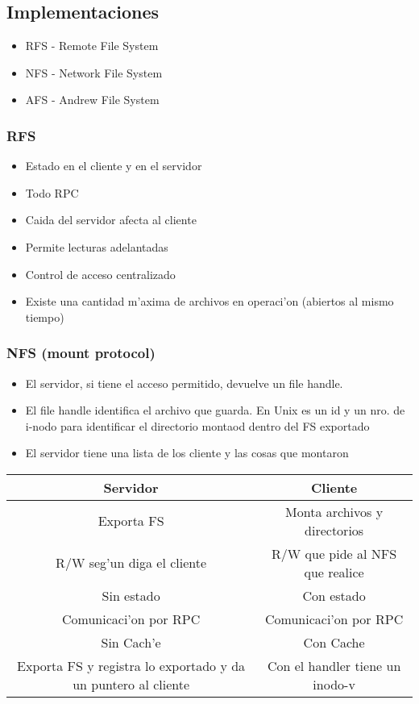 \documentclass[a4paper,spanish]{article}
\begin{document}
\subsection{Implementaciones}
\begin{itemize}
	\item RFS - Remote File System
	\item NFS - Network File System
	\item AFS - Andrew File System
\end{itemize}

\subsubsection{RFS}
\begin{itemize}
	\item Estado en el cliente y en el servidor
	\item Todo RPC
	\item Caida del servidor afecta al cliente
	\item Permite lecturas adelantadas
	\item Control de acceso centralizado
	\item Existe una cantidad m'axima de archivos en operaci'on (abiertos
al mismo tiempo)
\end{itemize}

\subsubsection{NFS (mount protocol)}
\begin{itemize}
	\item El servidor, si tiene el acceso permitido, devuelve un file handle.
	\item El file handle identifica el archivo que guarda. En Unix es un id
y un nro. de i-nodo para identificar el directorio montaod dentro del FS
exportado
	\item El servidor tiene una lista de los cliente y las cosas que
montaron
\end{itemize}

\begin{tabular}{|c|c|}
\hline
Servidor			& Cliente \\ \hline
Exporta FS		& Monta archivos y directorios \\
R/W seg'un diga el cliente	& R/W que pide al NFS que realice \\
Sin estado			& Con estado \\
Comunicaci'on por RPC		& Comunicaci'on por RPC \\
Sin Cach'e			& Con Cache \\
Exporta FS y registra lo exportado y da un puntero al cliente & Con el handler
tiene un inodo-v\\
\hline
\end{tabular}
\end{document}
